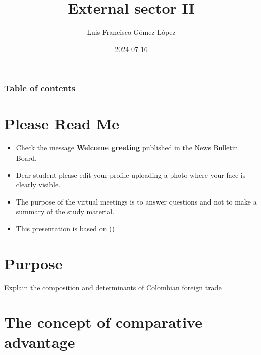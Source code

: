 \documentclass[
  ignorenonframetext,
]{beamer}
\title{External sector II}
\author{Luis Francisco Gómez López}
\date{2024-07-16}
\institute{FAEDIS}
\renewcommand*\contentsname{Table of contents}
\newcommand\contentsname{Table of contents}
\begin{document}
\frame{\titlepage}

\renewcommand*\contentsname{Table of contents}
\begin{frame}[allowframebreaks]
  \frametitle{Table of contents}
  \tableofcontents[hideallsubsections]
\end{frame}

\section{Please Read Me}\label{please-read-me}

\begin{frame}{}
\label{section}
\begin{itemize}
\item
  Check the message \textbf{Welcome greeting} published in the News
  Bulletin Board.
\item
  Dear student please edit your profile uploading a photo where your
  face is clearly visible.
\item
  The purpose of the virtual meetings is to answer questions and not to
  make a summary of the study material.
\item
  This presentation is based on
  ()
\end{itemize}
\end{frame}

\section{Purpose}\label{purpose}

\begin{frame}{}
\label{section-1}
Explain the composition and determinants of Colombian foreign trade
\end{frame}

\section{The concept of comparative
advantage}\label{the-concept-of-comparative-advantage}
\end{document}
